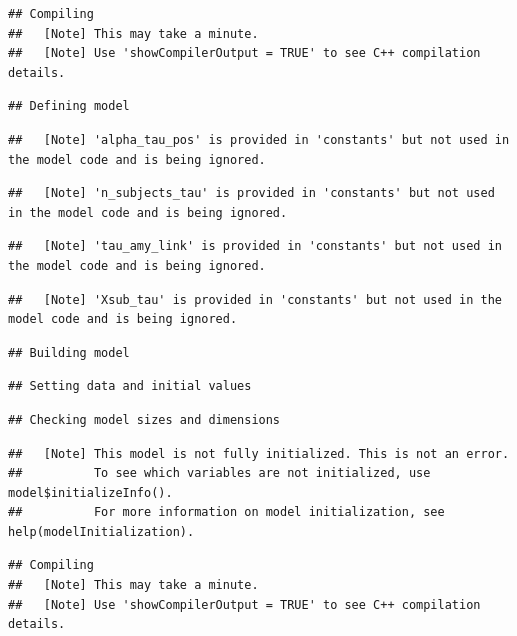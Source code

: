 \documentclass[
]{article}
\begin{document}
\begin{verbatim}
## Compiling
##   [Note] This may take a minute.
##   [Note] Use 'showCompilerOutput = TRUE' to see C++ compilation details.
\end{verbatim}

\begin{verbatim}
## Defining model
\end{verbatim}

\begin{verbatim}
##   [Note] 'alpha_tau_pos' is provided in 'constants' but not used in the model code and is being ignored.
\end{verbatim}

\begin{verbatim}
##   [Note] 'n_subjects_tau' is provided in 'constants' but not used in the model code and is being ignored.
\end{verbatim}

\begin{verbatim}
##   [Note] 'tau_amy_link' is provided in 'constants' but not used in the model code and is being ignored.
\end{verbatim}

\begin{verbatim}
##   [Note] 'Xsub_tau' is provided in 'constants' but not used in the model code and is being ignored.
\end{verbatim}

\begin{verbatim}
## Building model
\end{verbatim}

\begin{verbatim}
## Setting data and initial values
\end{verbatim}

\begin{verbatim}
## Checking model sizes and dimensions
\end{verbatim}

\begin{verbatim}
##   [Note] This model is not fully initialized. This is not an error.
##          To see which variables are not initialized, use model$initializeInfo().
##          For more information on model initialization, see help(modelInitialization).
\end{verbatim}

\begin{verbatim}
## Compiling
##   [Note] This may take a minute.
##   [Note] Use 'showCompilerOutput = TRUE' to see C++ compilation details.
\end{verbatim}
\end{document}

